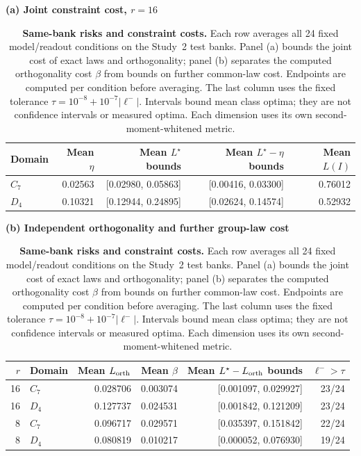 \begin{table}[t]
\caption{\textbf{Same-bank risks and constraint costs.} Each row averages all 24 fixed model/readout conditions on the Study~2 test banks. Panel (a) bounds the joint cost of exact laws and orthogonality; panel (b) separates the computed orthogonality cost $\beta$ from bounds on further common-law cost. Endpoints are computed per condition before averaging. The last column uses the fixed tolerance $\tau=10^{-8}+10^{-7}|\ell^-|$. Intervals bound mean class optima; they are not confidence intervals or measured optima. Each dimension uses its own second-moment-whitened metric.}
\label{tab:core-risk-summary}
\centering\small
\setlength{\tabcolsep}{4pt}
\textbf{(a) Joint constraint cost, $r=16$}\par\smallskip
\begin{tabular}{@{}lrrrr@{}}
\toprule
Domain & Mean $\eta$ & Mean $L^\star$ bounds & Mean $L^\star-\eta$ bounds & Mean $L(I)$ \\
\midrule
$C_7$ & 0.02563 & [0.02980, 0.05863] & [0.00416, 0.03300] & 0.76012 \\
$D_4$ & 0.10321 & [0.12944, 0.24895] & [0.02624, 0.14574] & 0.52932 \\
\bottomrule
\end{tabular}
\par\medskip
\textbf{(b) Independent orthogonality and further group-law cost}\par\smallskip
\begin{tabular}{@{}rlrrrr@{}}
\toprule
$r$ & Domain & Mean $L_{\rm orth}$ & Mean $\beta$ & Mean $L^\star-L_{\rm orth}$ bounds & $\ell^->\tau$ \\
\midrule
16 & $C_7$ & 0.028706 & 0.003074 & [0.001097, 0.029927] & 23/24 \\
16 & $D_4$ & 0.127737 & 0.024531 & [0.001842, 0.121209] & 23/24 \\
8 & $C_7$ & 0.096717 & 0.029571 & [0.035397, 0.151842] & 22/24 \\
8 & $D_4$ & 0.080819 & 0.010217 & [0.000052, 0.076930] & 19/24 \\
\bottomrule
\end{tabular}
\end{table}
